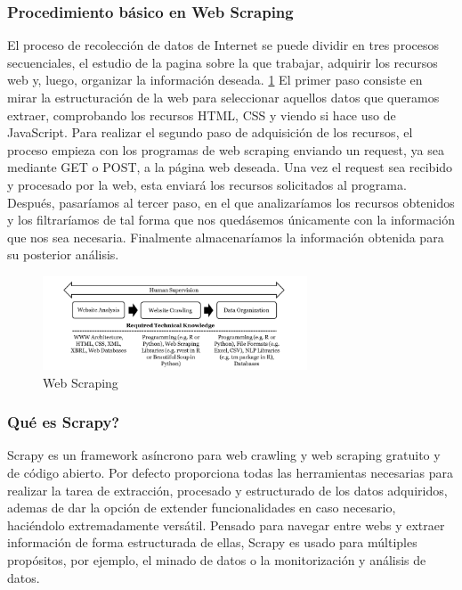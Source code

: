 \subsubsection{Procedimiento básico en Web Scraping}
El proceso de recolección de datos de Internet se puede dividir en tres procesos secuenciales, el estudio de la pagina sobre la que trabajar, adquirir los recursos web y, luego, organizar la información deseada. \ref{fig:ej2}
\newline
\newline
El primer paso consiste en mirar la estructuración de la web para seleccionar aquellos datos que queramos extraer, comprobando los recursos HTML, CSS y viendo si hace uso de JavaScript. Para realizar el segundo paso de adquisición de los recursos, el proceso empieza con los programas de web scraping enviando un request, ya sea mediante GET o POST, a la página web deseada. Una vez el request sea recibido y procesado por la web, esta enviará los recursos solicitados al programa. Después, pasaríamos al tercer paso, en el que analizaríamos los recursos obtenidos y los filtraríamos de tal forma que nos quedásemos únicamente con la información que nos sea necesaria. Finalmente almacenaríamos la información obtenida para su posterior análisis.
\newline
\begin{figure} [h!]
	\centering
	\includegraphics[width=0.7\textwidth]{fig/Web-Scraping-Adapted-from-Krotov-and-Tennyson-2018.png}
	\caption[Web Scraping (Krotov y Tennyson 2018)]{Web Scraping}
	\label{fig:ej2}
\end{figure}

\subsubsection{Qué es Scrapy?}
Scrapy es un framework asíncrono para web crawling y web scraping gratuito y de código abierto. Por defecto proporciona todas las herramientas necesarias para realizar la tarea de extracción, procesado y estructurado de los datos adquiridos, ademas de dar la opción de extender funcionalidades en caso necesario, haciéndolo extremadamente versátil. \cite{yang2019design}
\newline
\newline
Pensado para navegar entre webs y extraer información de forma estructurada de ellas, Scrapy es usado para múltiples propósitos, por ejemplo, el minado de datos o la monitorización y análisis de datos.

